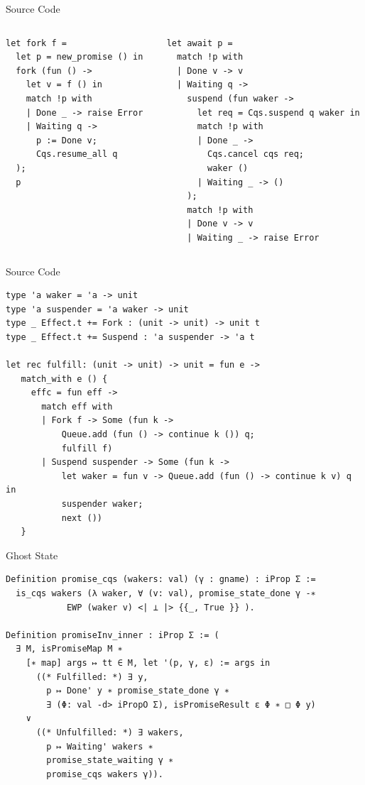 \documentclass[aspectratio=43]{beamer}
\begin{document}
\begin{frame}[fragile]{Source Code}
    \begin{columns}[t]
        \begin{column}{0.4\textwidth}
            \begin{verbatim}
let fork f =
  let p = new_promise () in
  fork (fun () ->
    let v = f () in
    match !p with
    | Done _ -> raise Error 
    | Waiting q -> 
      p := Done v;
      Cqs.resume_all q
  );
  p
\end{verbatim}
        \end{column}
        \begin{column}{0.5\textwidth}
            \begin{verbatim}
let await p =
  match !p with
  | Done v -> v
  | Waiting q ->
    suspend (fun waker ->
      let req = Cqs.suspend q waker in
      match !p with
      | Done _ -> 
        Cqs.cancel cqs req; 
        waker ()
      | Waiting _ -> ()
    );
    match !p with
    | Done v -> v
    | Waiting _ -> raise Error
\end{verbatim}
        \end{column}
    \end{columns}
\end{frame}


\begin{frame}[fragile]{Source Code}
    \begin{verbatim}
type 'a waker = 'a -> unit
type 'a suspender = 'a waker -> unit
type _ Effect.t += Fork : (unit -> unit) -> unit t
type _ Effect.t += Suspend : 'a suspender -> 'a t

let rec fulfill: (unit -> unit) -> unit = fun e ->
   match_with e () {
     effc = fun eff ->
       match eff with
       | Fork f -> Some (fun k ->
           Queue.add (fun () -> continue k ()) q;
           fulfill f)
       | Suspend suspender -> Some (fun k -> 
           let waker = fun v -> Queue.add (fun () -> continue k v) q in
           suspender waker;
           next ())
   }
    \end{verbatim}
\end{frame}

\begin{frame}[fragile]{Ghost State}
    \begin{verbatim}
Definition promise_cqs (wakers: val) (γ : gname) : iProp Σ :=
  is_cqs wakers (λ waker, ∀ (v: val), promise_state_done γ -∗
            EWP (waker v) <| ⊥ |> {{_, True }} ).
  
Definition promiseInv_inner : iProp Σ := (
  ∃ M, isPromiseMap M ∗ 
    [∗ map] args ↦ tt ∈ M, let '(p, γ, ε) := args in
      ((* Fulfilled: *) ∃ y,
        p ↦ Done' y ∗ promise_state_done γ ∗ 
        ∃ (Φ: val -d> iPropO Σ), isPromiseResult ε Φ ∗ □ Φ y)
    ∨
      ((* Unfulfilled: *) ∃ wakers,
        p ↦ Waiting' wakers ∗
        promise_state_waiting γ ∗
        promise_cqs wakers γ)).
\end{verbatim}
\end{frame}
\end{document}
